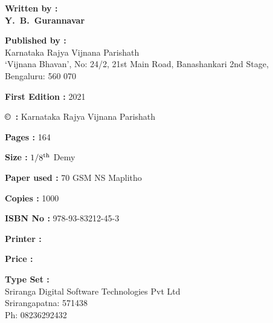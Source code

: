 {\fontsize {10}{12}\selectfont {\bfseries ORIGAMI MULAKA GANITHA MATTHU BILLEGALU}

\begin{center}
{\rm {\bfseries Written by :} \\
			{\bfseries Y.~B.~Gurannavar}}
   \end{center}


\begin{center}
{\rm {\bfseries Published by :} \\
			Karnataka Rajya Vijnana Parishath\\ ‘Vijnana Bhavan’, No: 24/2, 21st Main Road, Banashankari 2nd Stage,\\ Bengaluru: 560 070}
   \end{center}
 
 \vspace{-.4cm}
   
\begin{center}

\vspace{-.2cm}
{\rm {\bfseries First Edition :} 2021}


{\rm {\bfseries \copyright ~:} Karnataka Rajya Vijnana Parishath}


{\rm {\bfseries Pages :} 164}


{\rm {\bfseries Size :} $1/8^{\rm th}$ Demy}


{\rm {\bfseries Paper used :} 70 GSM NS Maplitho}


{\rm {\bfseries Copies :} 1000}


{\rm {\bfseries ISBN No :} 978-93-83212-45-3} 


{\rm {\bfseries Printer :}  }


{\rm {\bfseries Price :}  \rupee\ }

\end{center}

\begin{center}
{\rm {\bfseries Type Set :} \\
			Sriranga Digital Software Technologies Pvt Ltd\\ Srirangapatna: 571438\\ Ph: 08236292432}
   \end{center}
 }  
   

